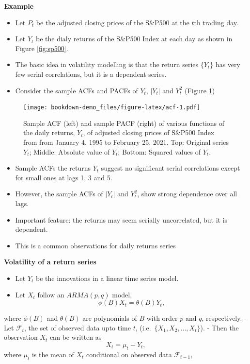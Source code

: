 \documentclass[]{book}
\providecommand{\tightlist}{%
  \setlength{\itemsep}{0pt}\setlength{\parskip}{0pt}}
\begin{document}
\textbf{Example}

\begin{itemize}
\tightlist
\item
  Let \(P_t\) be the adjusted closing prices of the S\&P500 at the \(t\)th trading day.
\item
  Let \(Y_t\) be the dialy returns of the S\&P500 Index at each day as shown in Figure \ref{fig:sp500}.
\item
  The basic idea in volatility modelling is that the return series \(\{Y_t\}\) has very few serial correlations, but it is a dependent series.
\item
  Consider the sample ACFs and PACFs of \(Y_t\), \(|Y_t|\) and \(Y_t^2\) (Figure \ref{fig:acf})
\end{itemize}

\begin{figure}
\centering
\texttt{[image: bookdown-demo\_files/figure-latex/acf-1.pdf]}
\caption{\label{fig:acf}Sample ACF (left) and sample PACF (right) of various functions of the daily returns, \(Y_t\), of adjusted closing prices of S\&P500 Index from from January 4, 1995 to February 25, 2021. Top: Original series \(Y_t\); Middle: Absolute value of \(Y_t\); Bottom: Squared values of \(Y_t\).}
\end{figure}

\begin{itemize}
\tightlist
\item
  Sample ACFs the returns \(Y_t\) suggest no significant serial correlations except for small ones at lags 1, 3 and 5.
\item
  However, the sample ACFs of \(|Y_t|\) and \(Y_t^2\), show strong dependence over all lags.
\item
  Important feature: the returns may seem serially uncorrelated, but it is dependent.
\item
  This is a common observations for daily returns series
\end{itemize}

\textbf{Volatility of a return series}

\begin{itemize}
\tightlist
\item
  Let \(Y_t\) be the innovations in a linear time series model.
\item
  Let \(X_t\) follow an \(ARMA(p,q)\) model,
  \[\phi(B)X_t=\theta(B)Y_t,\]
\end{itemize}

where \(\phi(B)\) and \(\theta(B)\) are polynomials of \(B\) with order \(p\) and \(q\), respectively.
- Let \(\mathcal{F}_t\), the set of observed data upto time \(t\), (i.e.~\(\{X_1,X_2,\dots, X_t\}\)).
- Then the observation \(X_t\) can be written as
\[X_t=\mu_t+Y_t,\]
where \(\mu_t\) is the mean of \(X_t\) conditional on observed data \(\mathcal{F}_{t-1},\)
\end{document}

